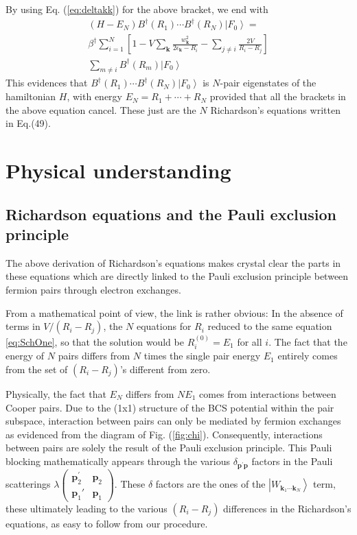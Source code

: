 \documentclass[aps,prb,superscriptaddress,showpacs,reprint,lengthcheck]{revtex4}
\newcommand{\vk}{\ensuremath{\mathbf{k}}}
\newcommand{\vp}{\ensuremath{\mathbf{p}}}
\begin{document}
By using  Eq. (\ref{eq:deltakk}) for the above bracket, we end with  
\begin{multline}  
(H-E _N)B^{\dagger}(R_1)\cdots{}B^{\dagger}(R_N)\left|F_0%
\right>  = \\
\beta^\dagger\sum_{i=1}^N\left[1-V\sum_\vk\frac{w_{\mathbf{k} }^2}{2\epsilon_{\mathbf{k}}-R_i}-\sum_{j\neq{}i}\frac{2V%
}{R_i-R_j}\right]\\
\sum_{m\neq{i}}B^{\dagger}(R_m)\left|F_0\right>  
\end{multline}
This evidences that $B^{\dagger}(R_1)\cdots{}B^{\dagger}(R_N)\left|F_0\right> $ is $N$-pair eigenstates of the hamiltonian $H$, with energy $E_N=R_1+\cdots+R_N$ provided that all the brackets in the above equation cancel. These just are the $N$ Richardson's equations written in Eq.(49).
\section{Physical understanding}

\subsection{Richardson equations and the Pauli exclusion principle}

The above  derivation of Richardson's equations makes crystal clear the parts in these equations which are directly linked
to the Pauli exclusion principle between fermion pairs through electron exchanges. 

From a mathematical point of view, the link is rather obvious: In the
absence of terms in $V/(R_i-R_j)$, the $N$ equations for $R_i$ reduced to
the same equation \eqref{eq:SchOne}, so that the solution would be $R^{(0)}_i=%
E _1$ for all $i$. The fact that the energy of $N$ pairs differs
from $N$ times the single pair energy $E_1$ entirely comes from the set of $(R_i-R_j)$'s
different from zero.

Physically, the fact that $E _N$ differs from $NE _1$
comes from interactions between Cooper pairs. Due to the (1x1) structure of the BCS
potential within the pair subspace, interaction between pairs can only be mediated by fermion
exchanges as evidenced from the diagram of Fig. (\ref{fig:chi}). 
Consequently, interactions between pairs
are solely the result of the Pauli exclusion principle. This
Pauli blocking mathematically appears through the various $\delta_{\mathbf{p}
^{\prime}\mathbf{p} }$ factors in the Pauli scatterings $\lambda(%
\begin{smallmatrix}\vp^\prime_2&\vp_2\\\vp_1'&\vp_1\end{smallmatrix})  $. These $\delta$ factors are the ones of the $\left|W_{\mathbf{k} _1\cdots\mathbf{k} _N}\right>$ term, these ultimately leading to the various $(R_i-R_j)$ differences
 in the Richardson's equations, as easy to follow from our procedure.
\end{document}
